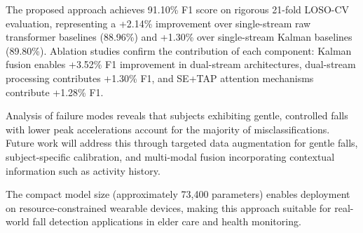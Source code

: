 \documentclass[journal,article,submit,pdftex,moreauthors]{../Definitions/mdpi}
\begin{document}
The proposed approach achieves 91.10\% F1 score on rigorous 21-fold LOSO-CV evaluation, representing a +2.14\% improvement over single-stream raw transformer baselines (88.96\%) and +1.30\% over single-stream Kalman baselines (89.80\%). Ablation studies confirm the contribution of each component: Kalman fusion enables +3.52\% F1 improvement in dual-stream architectures, dual-stream processing contributes +1.30\% F1, and SE+TAP attention mechanisms contribute +1.28\% F1.

Analysis of failure modes reveals that subjects exhibiting gentle, controlled falls with lower peak accelerations account for the majority of misclassifications. Future work will address this through targeted data augmentation for gentle falls, subject-specific calibration, and multi-modal fusion incorporating contextual information such as activity history.

The compact model size (approximately 73,400 parameters) enables deployment on resource-constrained wearable devices, making this approach suitable for real-world fall detection applications in elder care and health monitoring.





\end{document}
